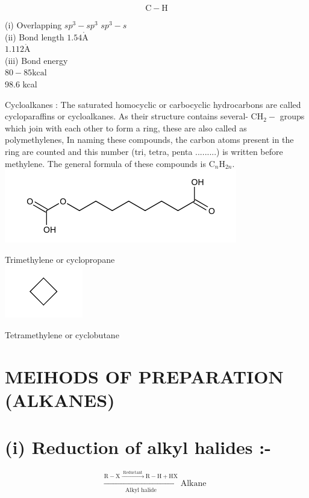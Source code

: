 \documentclass[10pt]{article}
\def\AA{\mathring{\mathrm{A}}}
\begin{document}
$$
\mathrm{C}-\mathrm{H}
$$

(i) Overlapping $s p^{3}-s p^{3}$ $s p^{3}-s$\\
(ii) Bond length $1.54 \AA$\\
$1.112 \AA$\\
(iii) Bond energy\\
$80-85 \mathrm{kcal}$\\
98.6 kcal

Cycloalkanes : The saturated homocyclic or carbocyclic hydrocarbons are called cycloparaffins or cycloalkanes. As their structure contains several- $\mathrm{CH}_{2}-$ groups which join with each other to form a ring, these are also called as polymethylenes, In naming these compounds, the carbon atoms present in the ring are counted and this number (tri, tetra, penta .........) is written before methylene. The general formula of these compounds is $\mathrm{C}_{n} \mathrm{H}_{2 n}$.\\
\includegraphics{smile-8f01e590ebee5e1b21bd3f20b152f11cfa10e9b5}

Trimethylene or cyclopropane\\
\includegraphics{smile-0adc94ad10c16bd2c9abd3c0c30f3e7545dbf7e9}

Tetramethylene or cyclobutane

\section*{MEIHODS OF PREPARATION (ALKANES)}
\section*{(i) Reduction of alkyl halides :-}
$$
\xrightarrow[\text { Alkyl halide }]{\mathrm{R}-\mathrm{X} \xrightarrow{\text { Reductant }} \mathrm{R}-\mathrm{H}+\mathrm{HX}} \text { Alkane }
$$
\end{document}
